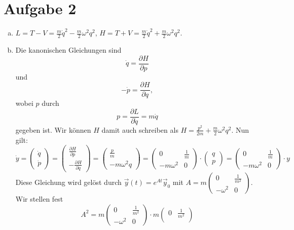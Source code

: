 \documentclass{article}
\theoremstyle{definition}
\begin{document}
\section*{Aufgabe 2}
\begin{enumerate}[(a)]
    \item $L = T - V = \frac{m}{2}\dot{q}^2 - \frac{m}{2}\omega^2 q^2$, $H = T + V = \frac{m}{2}\dot{q}^2 + \frac{m}{2}\omega^2 q^2$.
    \item Die kanonischen Gleichungen sind
    $$\dot q = \frac{\partial H}{\partial p}$$ und $$-\dot p = \frac{\partial H}{\partial q},$$ wobei $p$ durch $$p = \frac{\partial L}{\partial \dot q} = m \dot q$$ gegeben ist. Wir können $H$ damit auch schreiben als $H = \frac{p^2}{2m} + \frac{m}{2}\omega^2 q^2$. 
    Nun gilt:
    $$\dot y = \begin{pmatrix}
        \dot q\\ \dot p 
    \end{pmatrix} = \begin{pmatrix}
        \frac{\partial H}{\partial p}\\ -\frac{\partial H}{\partial q}
    \end{pmatrix} = \begin{pmatrix}
        \frac{p}{m} \\ -m \omega^2 q
    \end{pmatrix} = \begin{pmatrix}
        0 & \frac{1}{m}\\
        -m \omega^2 & 0
    \end{pmatrix}\cdot \begin{pmatrix}
        q\\ p
    \end{pmatrix} = \begin{pmatrix}
        0 & \frac{1}{m}\\
        -m \omega^2 & 0
    \end{pmatrix}\cdot y$$
    Diese Gleichung wird gelöst durch $\vec y(t) = e^{At}\vec y_0$ mit $A = m\begin{pmatrix}
        0 & \frac{1}{m^2}\\
        -\omega^2 & 0
    \end{pmatrix}$. Wir stellen fest 
    $$A^2 = m\begin{pmatrix}
        0 & \frac{1}{m^2}\\
        -\omega^2 & 0
    \end{pmatrix} \cdot m\begin{pmatrix}
        0 & \frac{1}{m^2}\\

\end{pmatrix}$$
\end{enumerate}
\end{document}
